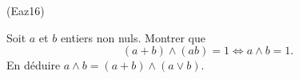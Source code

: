 \begin{tiny}(Eaz16)\end{tiny} Soit $a$ et $b$ entiers non nuls. Montrer que 
\[
(a+b) \wedge (ab) = 1 \Leftrightarrow a \wedge b = 1.
\]
En déduire $a\wedge b=(a+b)\wedge (a\vee b)$.